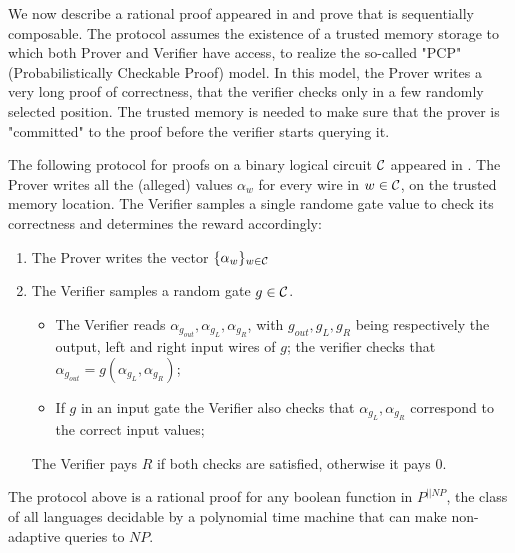 \begin{comment}
In this subsection we:
- describe PCP's protocol by AM
- describe certain assumptions on cost
- we prove that it is a Sequential Rational Proofs
\end{comment}

We now describe a rational proof appeared in \cite{am1} and prove that is sequentially composable.
The protocol assumes the existence of a trusted memory storage to which both 
Prover and Verifier have access, to realize the so-called "PCP" (Probabilistically Checkable Proof) model. In this model, the Prover 
writes a very long proof of correctness, that the verifier checks only in a few randomly selected position. The trusted memory is needed to 
make sure that the prover is "committed" to the proof before the verifier starts querying it. 

The following protocol for proofs on a binary logical circuit $\cal C$ 
appeared  in  \cite{am1}. The Prover writes all the (alleged) values $\alpha_w$ for every wire in $w \in {\cal C}$, 
on the trusted memory location. The Verifier 
samples a single randome gate value to check its correctness and determines the reward accordingly:
\begin{enumerate}
\item The Prover writes the vector $\{ \alpha_w\}_{w \in {\cal C}}$
\item The Verifier samples a random gate $g \in \cal C$.
\begin{itemize}
\item  The Verifier reads $\alpha_{g_{out}}, \alpha_{g_L}, \alpha_{g_R}$, with $g_{out}, g_L, g_R$ being respectively the output, left and right 
input wires of $g$; the verifier checks that $\alpha_{g_{out}} = g(\alpha_{g_L}, 
\alpha_{g_R})$;
\item If $g$ in an input gate the Verifier also checks that  $\alpha_{g_L}, \alpha_{g_R}$ correspond to the correct input values;
\end{itemize}
The Verifier pays $R$ if both checks are satisfied, otherwise it pays $0$.
\end{enumerate}

\begin{theorem}[\cite{am1}]
The protocol above is a rational proof for any boolean function in $
P^{||NP}$, the class of all languages decidable by a polynomial time machine 
that can make non-adaptive queries to $NP$.
\end{theorem}

